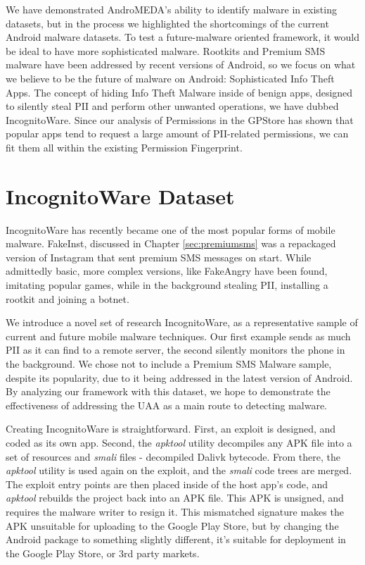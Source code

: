 We have demonstrated AndroMEDA's ability to identify malware in existing datasets, but in the process we highlighted the shortcomings of the current Android malware datasets. To test a future-malware oriented framework, it would be ideal to have more sophisticated malware. Rootkits and Premium SMS malware have been addressed by recent versions of Android, so we focus on what we believe to be the future of malware on Android: Sophisticated Info Theft Apps. The concept of hiding Info Theft Malware inside of benign apps, designed to silently steal PII and perform other unwanted operations, we have dubbed IncognitoWare. Since our analysis of Permissions in the GPStore has shown that popular apps tend to request a large amount of PII-related permissions, we can fit them all within the existing Permission Fingerprint. 

\section{IncognitoWare Dataset}
\label{sec:incognitoware}
IncognitoWare has recently became one of the most popular forms of mobile malware\citep{nq2013}. FakeInst, discussed in Chapter \ref{sec:premiumsms} was a repackaged version of Instagram\citep{instagramandroid} that sent premium SMS messages on start. While admittedly basic, more complex versions, like FakeAngry\citep{fakeangry} have been found, imitating popular games, while in the background stealing PII, installing a rootkit and joining a botnet.

We introduce a novel set of research IncognitoWare, as a representative sample of current and future mobile malware techniques. Our first example sends as much PII as it can find to a remote server, the second silently monitors the phone in the background. We chose not to include a Premium SMS Malware sample, despite its popularity\citep{nq2013}, due to it being addressed in the latest version of Android. By analyzing our framework with this dataset, we hope to demonstrate the effectiveness of addressing the UAA as a main route to detecting malware.

Creating IncognitoWare is straightforward. First, an exploit is designed, and coded as its own app. Second, the \textit{apktool}\citep{apktool} utility decompiles any APK file into a set of resources and \textit{smali} files - decompiled Dalivk bytecode. From there, the \textit{apktool} utility is used again on the exploit, and the \textit{smali} code trees are merged. The exploit entry points are then placed inside of the host app's code, and \textit{apktool} rebuilds the project back into an APK file. This APK is unsigned, and requires the malware writer to resign it. This mismatched signature makes the APK unsuitable for uploading to the Google Play Store, but by changing the Android package to something slightly different, it's suitable for deployment in the Google Play Store, or 3rd party markets.


